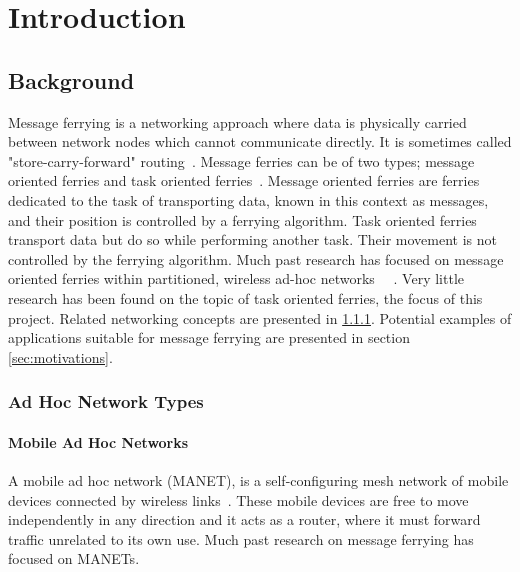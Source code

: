 
\chapter{Introduction} 

\section{Background}
Message ferrying is a networking approach where data is physically carried between network nodes which cannot communicate directly.
It is sometimes called "store-carry-forward" routing~\cite{Routing}.
Message ferries can be of two types; message oriented ferries and task oriented ferries~\cite{hybrid}.
Message oriented ferries are ferries dedicated to the task of transporting data, known in this context as messages, and their position is controlled by a ferrying algorithm.  
Task oriented ferries transport data but do so while performing another task.
Their movement is not controlled by the ferrying algorithm.
Much past research has focused on message oriented ferries within partitioned, wireless ad-hoc networks~\cite{Routing}~\cite{adhocmsgferry}	.
Very little research has been found on the topic of task oriented ferries, the focus of this project.
Related networking concepts are presented in \ref{sec:net_types}.
Potential examples of applications suitable for message ferrying are presented in section \ref{sec:motivations}.


\subsection{Ad Hoc Network Types}
\label{sec:net_types}

\subsubsection{Mobile Ad Hoc Networks}
A mobile ad hoc network (MANET),  is a self-configuring mesh network of mobile devices connected by wireless links~\cite{book1}.
These mobile devices are free to move independently in any direction and it acts as a router, where it must forward traffic unrelated to its own use.
Much past research on message ferrying has focused on MANETs.

